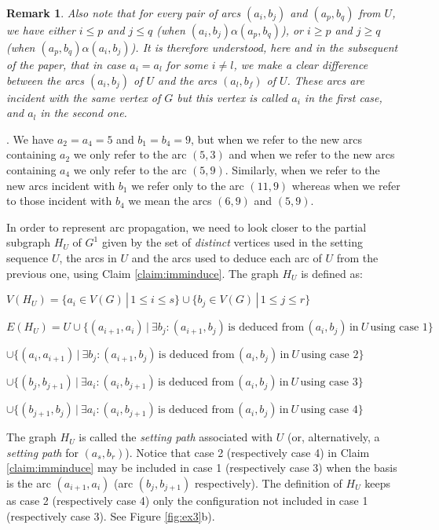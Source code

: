\documentclass{article}
\newtheorem{rmk}{Remark}
\newcommand{\br}{\begin{rmk}\rm}
\newcommand{\er}{\end{rmk}}
\begin{document}
\br
Also note that for every pair of  arcs $(a_i,b_j)$ and $(a_{p},b_{q})$ from $U$, we
have either $i\leq p$ and $j\leq q$ (when $(a_i,b_j)\alpha(a_p,b_q)$), or $i\geq p$ 
and $j\geq q$ (when $(a_p,b_q)\alpha(a_i,b_j)$). It is therefore understood,
here and in the subsequent of the paper, that in case $a_i=a_l$ for some $i\neq l$,
we make a clear difference between the arcs $(a_i,b_j)$ of $U$ and the arcs $(a_l, b_f)$ of $U$.
These arcs are incident with the same vertex of $G$ but this vertex is called $a_i$
in the first case, and $a_l$ in the second one.
\label{rem:HU}
\er

. We have
$a_2=a_4=5$ and $b_1=b_4=9$, but when we refer to the new arcs containing $a_2$ we only refer to
the arc $(5,3)$ and when we refer to the new arcs containing $a_4$ we only refer to the arc $(5,9)$.
Similarly, when we refer to the new arcs incident with $b_1$ we refer only to the arc $(11,9)$ whereas
when we refer to those incident with $b_4$ we mean the arcs $(6,9)$ and $(5,9)$.
\bigskip

In order to represent arc propagation, we need to look closer to the partial subgraph  $H_U$ of $G^1$ 
given by the set of {\em distinct} vertices  used in the
setting sequence $U$, the arcs in $U$ and the arcs used to deduce each arc of $U$ from the previous one, 
using Claim \ref{claim:imminduce}. The graph $H_U$ is defined as:
\medskip

$V(H_U)=\{a_i\in V(G)\, |\, 1\leq i\leq s\}\cup\{b_j\in V(G)\, |\, 1\leq j\leq r\}$ 

$E(H_U)=U\cup \{(a_{i+1}, a_i) \,|\ \exists b_j : (a_{i+1},b_j)\, \mbox{is deduced from}\, (a_i,b_j)\, \mbox{in}\ U\, \mbox{using case 1}\}$

\hspace*{1.85cm} $\cup \{(a_{i}, a_{i+1})\,|\ \exists b_j : (a_{i+1},b_j)\, \mbox{is deduced from}\, (a_i,b_j)\, \mbox{in}\ U\, \mbox{using case 2}\}$

\hspace*{1.9cm}$\cup \{(b_{j}, b_{j+1})\,|\ \exists a_i : (a_{i},b_{j+1})\, \mbox{is deduced from}\, (a_i,b_j)\, \mbox{in}\ U\, \mbox{using case 3}\}$

\hspace*{1.9cm}$\cup \{(b_{j+1}, b_{j})\,|\ \exists a_i : (a_{i},b_{j+1})\, \mbox{is deduced from}\, (a_i,b_j)\, \mbox{in}\ U\, \mbox{using case 4}\}$

\medskip

\noindent The graph $H_U$ is called the {\em setting path} associated with $U$ (or, alternatively, a {\em setting path}
for $(a_s,b_r)$). Notice that case 2 (respectively case 4) in Claim \ref{claim:imminduce} may be included in case 1 
(respectively case 3) when the basis is the arc $(a_{i+1},a_i)$ (arc $(b_j, b_{j+1})$ respectively). The definition of
$H_U$ keeps as case 2 (respectively case 4) only the configuration not included in case 1 (respectively case 3).
See Figure \ref{fig:ex3}b).
\end{document}
